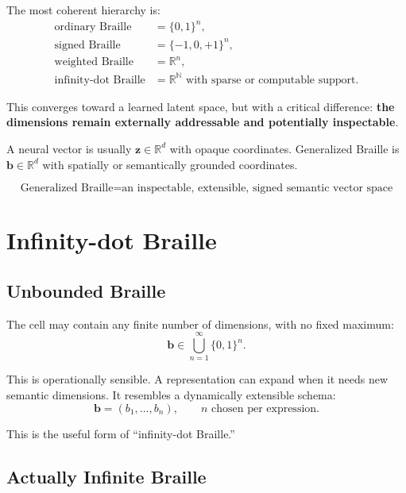 \documentclass[11pt,a4paper]{article}
\newcommand{\R}{\mathbb{R}}
\newcommand{\N}{\mathbb{N}}
\newcommand{\bvec}{\bm{b}}
\begin{document}
The most coherent hierarchy is:
\begin{align}
  \text{ordinary Braille}   &= \{0,1\}^n, \\
  \text{signed Braille}     &= \{-1,0,+1\}^n, \\
  \text{weighted Braille}   &= \R^n, \\
  \text{infinity-dot Braille} &= \R^{\N} \text{ with sparse or computable support}.
\end{align}

This converges toward a learned latent space, but with a critical
difference: \textbf{the dimensions remain externally addressable
and potentially inspectable}.

A neural vector is usually $\bm{z} \in \R^d$ with opaque coordinates.
Generalized Braille is $\bvec \in \R^d$ with spatially or semantically
grounded coordinates.

\begin{equation}
  \boxed{
    \text{Generalized Braille}
    = \text{an inspectable, extensible, signed semantic vector space}
  }
\end{equation}

\section{Infinity-dot Braille}
\label{sec:infinity}

\subsection{Unbounded Braille}

The cell may contain any finite number of dimensions, with no fixed
maximum:
\begin{equation}
  \bvec \in \bigcup_{n=1}^{\infty} \{0,1\}^n.
\end{equation}

This is operationally sensible.
A representation can expand when it needs new semantic dimensions.
It resembles a dynamically extensible schema:
\begin{equation}
  \bvec = (b_1, \ldots, b_n), \qquad n \text{ chosen per expression}.
\end{equation}

This is the useful form of ``infinity-dot Braille.''

\subsection{Actually Infinite Braille}
\end{document}

